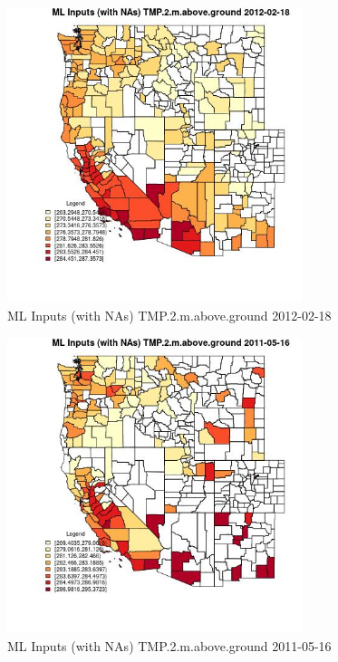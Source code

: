 \clearpage 

\begin{figure} 
\centering  
\includegraphics[width=0.77\textwidth]{Code_Outputs/Report_ML_input_PM25_Step4_part_f_de_duplicated_aves_prioritize_24hr_obswNAs_CountyTMP2mabovegroundMean2012-02-18.jpg} 
\caption{\label{fig:Report_ML_input_PM25_Step4_part_f_de_duplicated_aves_prioritize_24hr_obswNAsCountyTMP2mabovegroundMean2012-02-18}ML Inputs (with NAs) TMP.2.m.above.ground 2012-02-18} 
\end{figure} 
 

\begin{figure} 
\centering  
\includegraphics[width=0.77\textwidth]{Code_Outputs/Report_ML_input_PM25_Step4_part_f_de_duplicated_aves_prioritize_24hr_obswNAs_CountyTMP2mabovegroundMean2011-05-16.jpg} 
\caption{\label{fig:Report_ML_input_PM25_Step4_part_f_de_duplicated_aves_prioritize_24hr_obswNAsCountyTMP2mabovegroundMean2011-05-16}ML Inputs (with NAs) TMP.2.m.above.ground 2011-05-16} 
\end{figure} 
 

